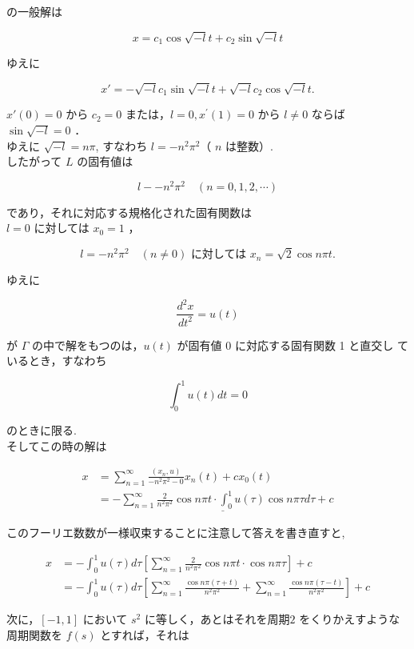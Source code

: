 \documentclass{jsarticle}
\begin{document}
の一般解は

$$
x=c_{1} \cos \sqrt{-l}t + c_{2} \sin \sqrt{-l} t
$$

ゆえに

$$
x' = -\sqrt{-l}c_1\sin\sqrt{-l}t + \sqrt{-l}c_2\cos\sqrt{-l}t.
$$

$x'(0) = 0$ から $c_{2}=0$ または，$l=0, x^{\prime}(1)=0$ から $l \neq 0$ ならば $\sin \sqrt{-l} = 0$ ．\\
ゆえに $\sqrt{-l} = n \pi$, すなわち $l=-n^{2} \pi^{2}$（ $n$ は整数）.\\
したがって $L$ の固有値は

$$
l--n^{2} \pi^{2} \quad(n=0,1,2, \cdots)
$$

であり，それに対応する規格化された固有関数は\\
$l=0$ に対しては $x_{0} = 1$ ，

$$
l=-n^{2} \pi^{2} \quad(n \neq 0) \text { に対しては } x_{n}=\sqrt{2} \cos n \pi t .
$$

ゆえに

$$
\frac{d^{2} x}{d t^{2}}=u(t)
$$

が $\Gamma$ の中で解をもつのは，$u(t)$ が固有値 0 に対応する固有関数 1 と直交し ているとき，すなわち

$$
\int_{0}^{1} u(t) d t=0
$$

のときに限る.\\
そしてこの時の解は

$$
\begin{aligned}
x & =\sum_{n=1}^{\infty} \frac{\left(x_{n}, u\right)}{-n^{2} \pi^{2}-0} x_{n}(t)+c x_{0}(t) \\
& =\underline{-\sum_{n=1}^{\infty} \frac{2}{n^{2} \pi^{2}} \cos n \pi t \cdot \int_{0}^{1} u(\tau) \cos n \pi \tau d \tau+c}
\end{aligned}
$$

このフーリエ数数が一様収束することに注意して答えを書き直すと,

$$
\begin{aligned}
x & =-\int_{0}^{1} u(\tau) d \tau\left[\sum_{n=1}^{\infty} \frac{2}{n^{2} \pi^{2}} \cos n \pi t \cdot \cos {n\pi \tau} \right]+c \\
& =-\int_{0}^{1} u(\tau) d \tau \left[\sum_{n=1}^{\infty} \frac{\cos n \pi(\tau+t)}{n^{2} \pi^{2}}+\sum_{n=1}^{\infty} \frac{\cos n\pi(\tau - t)}{n^2\pi^2} \right] + c
\end{aligned}
$$

次に，$[-1,1]$ において $s^{2}$ に等しく，あとはそれを周期$2$ をくりかえすような周期関数を $f(s)$ とすれば，それは
\end{document}
